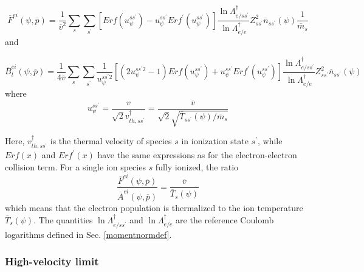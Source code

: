 \begin{equation}
\overline{F}^{ei}\left( \psi ,\overline{p}\right) =\frac{1}{\overline{v}^{2}}%
\sum_{s}\sum_{s^{\prime }}\left[ Erf\left( u_{\psi }^{ss^{\prime }}\right)
-u_{\psi }^{ss^{\prime }}Erf^{\prime }\left( u_{\psi }^{ss^{\prime }}\right)
\right] \frac{\ln \Lambda _{e/ss^{\prime }}^{\dagger }}{\ln \Lambda
_{e/e}^{\dagger }}Z_{ss^{\prime }}^{2}\overline{n}_{ss^{\prime }}\left( \psi
\right) \frac{1}{\overline{m}_{s}}
\end{equation}
and

\begin{equation}
\overline{B}_{t}^{ei}\left( \psi ,\overline{p}\right) =\frac{1}{4\overline{v}%
}\sum_{s}\sum_{s^{\prime }}\frac{1}{u_{\psi }^{ss^{\prime }2}}\left[ \left(
2u_{\psi }^{ss^{\prime }2}-1\right) Erf\left( u_{\psi }^{ss^{\prime
}}\right) +u_{\psi }^{ss^{\prime }}Erf^{\prime }\left( u_{\psi }^{ss^{\prime
}}\right) \right] \frac{\ln \Lambda _{e/ss^{\prime }}^{\dagger }}{\ln
\Lambda _{e/e}^{\dagger }}Z_{ss^{\prime }}^{2}\overline{n}_{ss^{\prime
}}\left( \psi \right)
\end{equation}
where
\begin{equation}
u_{\psi }^{ss^{\prime }}=\frac{v}{\sqrt{2}v_{th,ss^{\prime }}^{\dagger }}=%
\frac{\overline{v}}{\sqrt{2}\sqrt{\overline{T}_{ss^{\prime }}\left( \psi
\right) /\overline{m}_{s}}}
\end{equation}

Here, $v_{th,ss^{\prime }}^{\dagger }$ is the thermal velocity of species $s$
in ionization state $s^{\prime }$, while $Erf(x)$ and $Erf^{\prime }(x)$
have the same expressions as for the electron-electron collision term. For a
single ion species $s$ fully ionized, the ratio
\begin{equation}
\frac{\overline{F}^{ei}\left( \psi ,\overline{p}\right) }{\overline{A}%
^{ei}\left( \psi ,\overline{p}\right) }=\frac{\overline{v}}{\overline{T}%
_{s}\left( \psi \right) }
\end{equation}
which means that the electron population is thermalized to the ion
temperature $\overline{T}_{s}\left( \psi \right) .$ The quantities $\ln
\Lambda _{e/ss^{\prime }}^{\dagger }$ and $\ln \Lambda _{e/e}^{\dagger }$
are the reference Coulomb logarithms defined in Sec. \ref{momentnormdef}.

\subsubsection{High-velocity limit}

